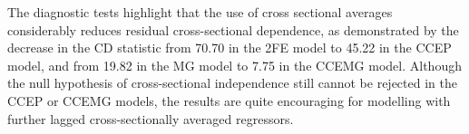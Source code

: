 \documentclass[12pt]{article}
\begin{document}
The diagnostic tests highlight that the use of cross sectional averages considerably reduces residual cross-sectional dependence, as demonstrated by the decrease in the \citet{Pesaran2004} CD statistic from 70.70 in the 2FE model to 45.22 in the CCEP model, and from 19.82 in the MG model to 7.75 in the CCEMG model. Although the null hypothesis of cross-sectional independence still cannot be rejected in the CCEP or CCEMG models, the results are quite encouraging for modelling with further lagged cross-sectionally averaged regressors. 
\end{document}
